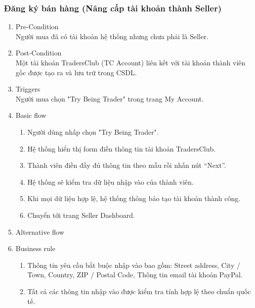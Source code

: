 \subsubsection{Đăng ký bán hàng (Nâng cấp tài khoản thành Seller)}
\begin{enumerate}
	\item Pre-Condition\\
	Người mua đã có tài khoản hệ thống nhưng chưa phải là Seller.
	\item Post-Condition\\
	Một tài khoản TradersClub (TC Account) liên kết với tài khoản thành viên gốc được tạo ra và lưu trữ trong CSDL.
	\item Triggers\\
	Người mua chọn "Try Being Trader" trong trang My Account.
	\item Basic flow
	\begin{enumerate}
		\item Người dùng nhấp chọn "Try Being Trader".
		\item Hệ thống hiển thị form điền thông tin tài khoản TradersClub.
		\item Thành viên điền đầy đủ thông tin theo mẫu rồi nhấn nút “Next”.
		\item Hệ thống sẽ kiểm tra dữ liệu nhập vào của thành viên. \item Khi mọi dữ liệu hợp lệ, hệ thống thông báo tạo tài khoản thành công.
		\item Chuyển tới trang Seller Dashboard.
	\end{enumerate}
	\item Alternative flow
	\item Business rule
	\begin{enumerate}
	\item Thông tin yêu cầu bắt buộc nhập vào bao gồm: Street address, City / Town, Country, ZIP / Postal Code, Thông tin email tài khoản PayPal.
	\item Tất cả các thông tin nhập vào được kiểm tra tính hợp lệ theo chuẩn quốc tế.
	\end{enumerate}
\end{enumerate}

